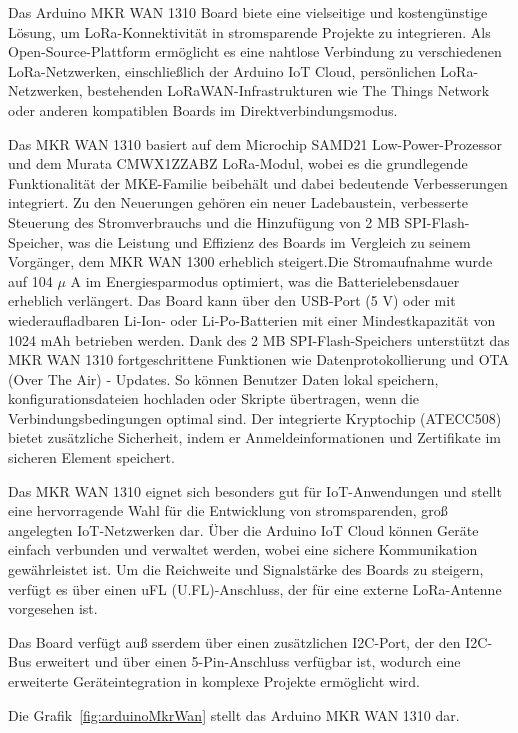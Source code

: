 Das Arduino MKR WAN 1310 Board biete eine vielseitige und kostengünstige Lösung, um LoRa-Konnektivität in stromsparende Projekte zu integrieren. Als Open-Source-Plattform ermöglicht es eine nahtlose Verbindung zu verschiedenen LoRa-Netzwerken, einschließlich der Arduino IoT Cloud, persönlichen LoRa-Netzwerken, bestehenden LoRaWAN-Infrastrukturen wie The Things Network oder anderen kompatiblen Boards im Direktverbindungsmodus.

Das MKR WAN 1310 basiert auf dem Microchip SAMD21 Low-Power-Prozessor und dem Murata CMWX1ZZABZ LoRa-Modul, wobei es die grundlegende Funktionalität der MKE-Familie beibehält und dabei bedeutende Verbesserungen integriert. Zu den Neuerungen gehören ein neuer Ladebaustein, verbesserte Steuerung des Stromverbrauchs und die Hinzufügung von 2 MB SPI-Flash-Speicher, was die Leistung und Effizienz des Boards im Vergleich zu seinem Vorgänger, dem MKR WAN 1300 erheblich steigert.Die Stromaufnahme wurde auf 104 $\mu$ A im Energiesparmodus optimiert, was die Batterielebensdauer erheblich verlängert. Das Board kann über den USB-Port (5 V) oder mit wiederaufladbaren Li-Ion- oder Li-Po-Batterien mit einer Mindestkapazität von 1024 mAh betrieben werden.
Dank des 2 MB SPI-Flash-Speichers unterstützt das MKR WAN 1310 fortgeschrittene Funktionen wie Datenprotokollierung und OTA (Over The Air) - Updates. So können Benutzer Daten lokal speichern, konfigurationsdateien hochladen oder Skripte übertragen, wenn die Verbindungsbedingungen optimal sind. Der integrierte Kryptochip (ATECC508) bietet zusätzliche Sicherheit, indem er Anmeldeinformationen und Zertifikate im sicheren Element speichert.

Das MKR WAN 1310 eignet sich besonders gut für IoT-Anwendungen und stellt eine hervorragende Wahl für die Entwicklung von stromsparenden, groß angelegten IoT-Netzwerken dar. Über die Arduino IoT Cloud können Geräte einfach verbunden und verwaltet werden, wobei eine sichere Kommunikation gewährleistet ist. Um die Reichweite und Signalstärke des Boards zu steigern, verfügt es über einen uFL (U.FL)-Anschluss, der für eine externe LoRa-Antenne vorgesehen ist.

{\tiny }Das Board verfügt au{\ss} sserdem über einen zusätzlichen I2C-Port, der den I2C-Bus erweitert und über einen 5-Pin-Anschluss verfügbar ist, wodurch eine erweiterte Geräteintegration in komplexe Projekte ermöglicht wird. \cite{Allan:2018}

Die Grafik~\ref{fig:arduinoMkrWan} stellt das Arduino MKR WAN 1310 dar.

